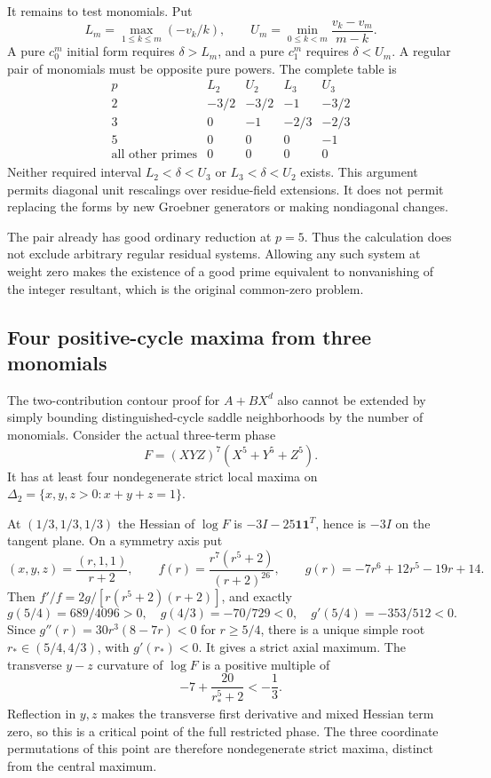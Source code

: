 \documentclass[11pt]{article}
\begin{document}
It remains to test monomials. Put
\[
 L_m=\max_{1\le k\le m}(-v_k/k),\qquad
 U_m=\min_{0\le k<m}\frac{v_k-v_m}{m-k}.
\]
A pure $c_0^m$ initial form requires $\delta>L_m$, and a pure $c_1^m$
requires $\delta<U_m$. A regular pair of monomials must be opposite pure
powers. The complete table is
\[
\begin{array}{c|rrrr}
p&L_2&U_2&L_3&U_3\\ \hline
2&-3/2&-3/2&-1&-3/2\\
3&0&-1&-2/3&-2/3\\
5&0&0&0&-1\\
\text{all other primes}&0&0&0&0
\end{array}
\]
Neither required interval $L_2<\delta<U_3$ or $L_3<\delta<U_2$ exists.
This argument permits diagonal unit rescalings over residue-field
extensions. It does not permit replacing the forms by new Groebner
generators or making nondiagonal changes.

The pair already has good ordinary reduction at $p=5$. Thus the
calculation does not exclude arbitrary regular residual systems.
Allowing any such system at weight zero makes the existence of a good
prime equivalent to nonvanishing of the integer resultant, which is the
original common-zero problem.

\subsection{Four positive-cycle maxima from three monomials}
The two-contribution contour proof for $A+BX^d$ also cannot be extended
by simply bounding distinguished-cycle saddle neighborhoods by the
number of monomials. Consider the actual three-term phase
\[
 F=(XYZ)^7(X^5+Y^5+Z^5).
\]
It has at least four nondegenerate strict local maxima on
$\Delta_2=\{x,y,z>0:x+y+z=1\}$.

At $(1/3,1/3,1/3)$ the Hessian of $\log F$ is
$-3I-25\mathbf1\mathbf1^T$, hence is $-3I$ on the tangent plane.
On a symmetry axis put
\[
 (x,y,z)=\frac{(r,1,1)}{r+2},\qquad
 f(r)=\frac{r^7(r^5+2)}{(r+2)^{26}},\qquad
 g(r)=-7r^6+12r^5-19r+14.
\]
Then $f'/f=2g/[r(r^5+2)(r+2)]$, and exactly
\[
 g(5/4)=689/4096>0,\quad g(4/3)=-70/729<0,\quad
 g'(5/4)=-353/512<0.
\]
Since $g''(r)=30r^3(8-7r)<0$ for $r\ge5/4$, there is a unique simple
root $r_*\in(5/4,4/3)$, with $g'(r_*)<0$. It gives a strict axial
maximum. The transverse $y-z$ curvature of $\log F$ is a positive
multiple of
\[
 -7+\frac{20}{r_*^5+2}<-\frac13.
\]
Reflection in $y,z$ makes the transverse first derivative and mixed
Hessian term zero, so this is a critical point of the full restricted
phase. The three coordinate permutations of this point are therefore
nondegenerate strict maxima, distinct from the central maximum.
\end{document}
